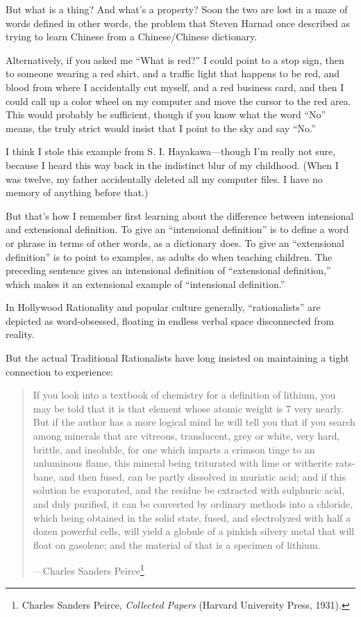 {
 But what is a thing? And what's a property? Soon
the two are lost in a maze of words defined in other words, the problem
that Steven Harnad once described as trying to learn Chinese from a
Chinese/Chinese dictionary.}

{
 Alternatively, if you asked me ``What is
red?'' I could point to a stop sign, then to someone
wearing a red shirt, and a traffic light that happens to be red, and
blood from where I accidentally cut myself, and a red business card,
and then I could call up a color wheel on my computer and move the
cursor to the red area. This would probably be sufficient, though if
you know what the word ``No'' means,
the truly strict would insist that I point to the sky and say
``No.''}

{
 I think I stole this example from S. I. Hayakawa---though
I'm really not sure, because I heard this way back in
the indistinct blur of my childhood. (When I was twelve, my father
accidentally deleted all my computer files. I have no memory of
anything before that.)}

{
 But that's how I remember first learning about the
difference between intensional and extensional definition. To give an
``intensional definition'' is to
define a word or phrase in terms of other words, as a dictionary does.
To give an ``extensional
definition'' is to point to examples, as adults do
when teaching children. The preceding sentence gives an intensional
definition of ``extensional
definition,'' which makes it an extensional example
of ``intensional definition.''}

{
 In Hollywood Rationality and popular culture generally,
``rationalists'' are depicted as
word-obsessed, floating in endless verbal space disconnected from
reality.}

{
 But the actual Traditional Rationalists have long insisted on
maintaining a tight connection to experience:}

\begin{quote}
{
 If you look into a textbook of chemistry for a definition of
lithium, you may be told that it is that element whose atomic weight is
7 very nearly. But if the author has a more logical mind he will tell
you that if you search among minerals that are vitreous, translucent,
grey or white, very hard, brittle, and insoluble, for one which imparts
a crimson tinge to an unluminous flame, this mineral being triturated
with lime or witherite rats-bane, and then fused, can be partly
dissolved in muriatic acid; and if this solution be evaporated, and the
residue be extracted with sulphuric acid, and duly purified, it can be
converted by ordinary methods into a chloride, which being obtained in
the solid state, fused, and electrolyzed with half a dozen powerful
cells, will yield a globule of a pinkish silvery metal that will float
on gasolene; and the material of that is a specimen of lithium.}

{\raggedleft
 {}---Charles Sanders Peirce\footnote{Charles Sanders Peirce, \textit{Collected Papers} (Harvard
University Press, 1931).}
\par}
\end{quote}


